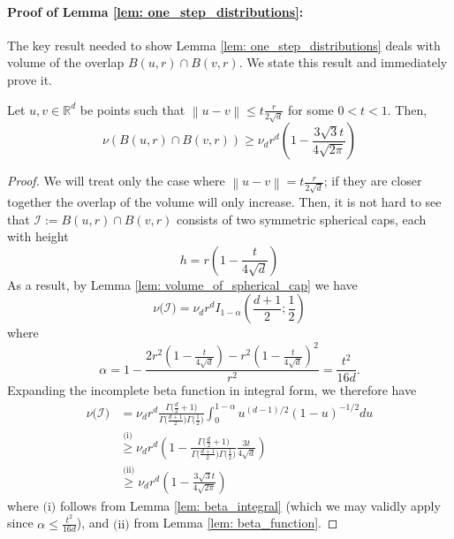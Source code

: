 \documentclass[11pt,twoside]{article}
\newcommand{\Reals}{\mathbb{R}}
\newcommand{\Rd}{\Reals^d}
\newcommand{\norm}[1]{\left\lVert#1\right\rVert}
\newcommand{\1}{\mathbbm{1}}
\begin{document}
\paragraph{Proof of Lemma \ref{lem: one_step_distributions}:}

The key result needed to show Lemma \ref{lem: one_step_distributions} deals with volume of the overlap $B(u,r) \cap B(v,r)$. We state this result and immediately prove it.
\begin{lemma}
	\label{lem: overlap_balls_1}
	Let $u,v \in \Rd$ be points such that $\norm{u - v} \leq t\frac{r}{2\sqrt{d}}$ for some $0 < t < 1$. Then,
	\begin{equation*}
	\nu(B(u,r) \cap B(v,r)) \geq \nu_d r^d \left(1 - \frac{3 \sqrt{3} t}{4\sqrt{2\pi}} \right)
	\end{equation*}
\end{lemma}
\begin{proof}
	We will treat only the case where $\norm{u - v} = t\frac{r}{2\sqrt{d}}$; if they are closer together the overlap of the volume will only increase. Then, it is not hard to see that $\mathcal{I} := B(u,r) \cap B(v,r)$ consists of two symmetric spherical caps, each with height
	\begin{equation*}
	h = r\left(1 - \frac{t}{4\sqrt{d}}\right)
	\end{equation*} 
	As a result, by Lemma \ref{lem: volume_of_spherical_cap} we have
	\begin{equation*}
	\nu\bigl(\mathcal{I}\bigr) = \nu_d r^d I_{1 - \alpha}(\frac{d + 1}{2}; \frac{1}{2})
	\end{equation*}
	where
	\begin{equation*}
	\alpha = 1 - \frac{2r^2(1 - \frac{t}{4 \sqrt{d}}) - r^2(1 - \frac{t}{4 \sqrt{d}})^2}{r^2} = \frac{t^2}{16d}.
	\end{equation*}
	Expanding the incomplete beta function in integral form, we therefore have
	\begin{align*}
	\nu\bigl(\mathcal{I}\bigr) & = \nu_d r^d \frac{\Gamma\bigl(\frac{d}{2}+ 1\bigr)}{\Gamma\bigl(\frac{d + 1}{2}\bigr) \Gamma\bigl(\frac{1}{2}\bigr)} \int_{0}^{1 - \alpha}u^{(d-1)/2}(1 - u)^{-1/2}du \\
	& \overset{\text{(i)}}{\geq} \nu_d r^d \left(1 - \frac{\Gamma\bigl(\frac{d}{2}+ 1\bigr)}{\Gamma\bigl(\frac{d + 1}{2}\bigr) \Gamma\bigl(\frac{1}{2}\bigr)} \frac{3 t}{4\sqrt{d}} \right) \\
	& \overset{\text{(ii)}}{\geq} \nu_d r^d \left(1 -  \frac{3 \sqrt{3} t}{4\sqrt{2\pi}} \right)
	\end{align*}
	where $\text{(i)}$ follows from Lemma \ref{lem: beta_integral} (which we may validly apply since $\alpha \leq \frac{t^2}{16d}$), and $\text{(ii)}$ from Lemma \ref{lem: beta_function}.
\end{proof}
\end{document}
